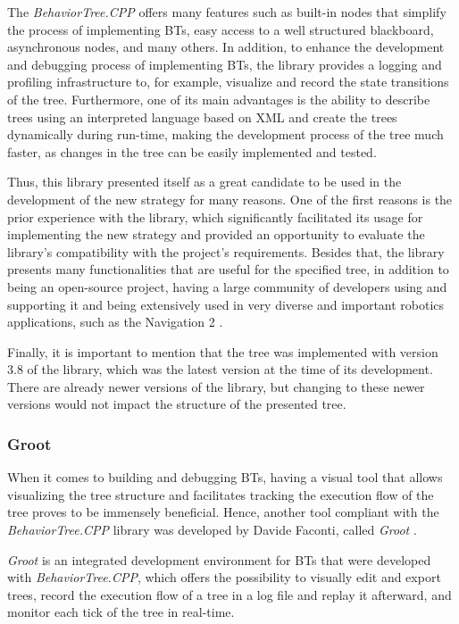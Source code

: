 The \textit{BehaviorTree.CPP} offers many features such as built-in nodes that simplify the process of implementing BTs, easy access to a well structured blackboard, asynchronous nodes, and many others. In addition, to enhance the development and debugging process of implementing BTs, the library provides a logging and profiling infrastructure to, for example, visualize and record the state transitions of the tree. Furthermore, one of its main advantages is the ability to describe trees using an interpreted language based on XML and create the trees dynamically during run-time, making the development process of the tree much faster, as changes in the tree can be easily implemented and tested.

Thus, this library presented itself as a great candidate to be used in the development of the new strategy for many reasons. One of the first reasons is the prior experience with the library, which significantly facilitated its usage for implementing the new strategy and provided an opportunity to evaluate the library's compatibility with the project's requirements. Besides that, the library presents many functionalities that are useful for the specified tree, in addition to being an open-source project, having a large community of developers using and supporting it and being extensively used in very diverse and important robotics applications, such as the Navigation 2 \cite{nav2}. 

Finally, it is important to mention that the tree was implemented with version 3.8 of the library, which was the latest version at the time of its development. There are already newer versions of the library, but changing to these newer versions would not impact the structure of the presented tree.

\subsubsection{Groot}
\label{subsubsec:groot}

When it comes to building and debugging BTs, having a visual tool that allows visualizing the tree structure and facilitates tracking the execution flow of the tree proves to be immensely beneficial. Hence, another tool compliant with the \textit{BehaviorTree.CPP} library was developed by Davide Faconti, called \textit{Groot} \cite{Groot}.

\textit{Groot} is an integrated development environment for BTs that were developed with \textit{BehaviorTree.CPP}, which offers the possibility to visually edit and export trees, record the execution flow of a tree in a log file and replay it afterward, and monitor each tick of the tree in real-time.

